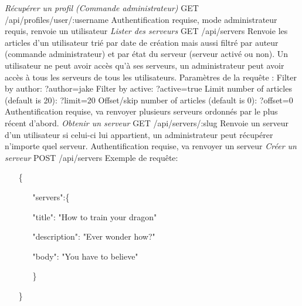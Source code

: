 \documentclass{article}
\begin{document}
\newline
\newline
\textit{Récupérer un profil (Commande administrateur)}
\newline
GET /api/profiles/user/:username
\newline
Authentification requise, mode administrateur requis, renvoie un utilisateur
\newline
\newline
\textit{Lister des serveurs}
\newline
GET /api/servers
\newline
Renvoie les articles d'un utilisateur trié par date de création mais aussi filtré par auteur (commande administrateur) et par état du serveur (serveur activé ou non).
\newline
Un utilisateur ne peut avoir accès qu'à ses serveurs, un administrateur peut avoir accès à tous les serveurs de tous les utilisateurs.
\newline
Paramètres de la requête :
\newline
Filter by author:
\newline
?author=jake
\newline
Filter by active:
\newline
?active=true
\newline
Limit number of articles (default is 20):
\newline
?limit=20
\newline
Offset/skip number of articles (default is 0):
\newline
?offset=0
\newline
Authentification requise, va renvoyer plusieurs serveurs ordonnés par le plus récent d'abord.
\newline
\newline
\textit{Obtenir un serveur}
\newline
GET /api/servers/:slug
\newline
Renvoie un serveur d'un utilisateur si celui-ci lui appartient, un administrateur peut récupérer n'importe quel serveur.
\newline
Authentification requise, va renvoyer un serveur
\newline
\newline
\textit{Créer un serveur}
\newline
POST /api/servers
\newline
Exemple de requête:
\begin{itemize}
	\item[\{]
	\begin{itemize}
		\item[]
		\item["servers":\{]
		\item[]"title": "How to train your dragon"
		\item[]"description": "Ever wonder how?"
		\item[]"body": "You have to believe"
		\item[\}]
	\end{itemize}
	\item[\}]
\end{itemize}
\end{document}
